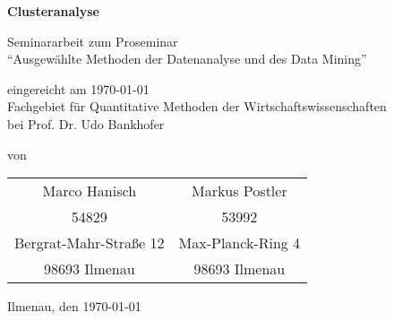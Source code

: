 \begin{titlepage}

\begin{center}
\vspace{1cm}
\large{\textbf{Clusteranalyse}}

\vspace{2cm}

\large{Seminararbeit zum Proseminar} \\ 
``Ausgewählte Methoden der Datenanalyse und des Data Mining'' \\

\vspace{4cm}

eingereicht am \today \\
Fachgebiet für Quantitative Methoden der Wirtschaftswissenschaften \\
bei Prof. Dr. Udo Bankhofer \\

\vspace{5cm}

von \\
\begin{tabular}{cc}
   Marco Hanisch & Markus Postler \\ 
   54829 & 53992 \\ 
   Bergrat-Mahr-Straße 12 & Max-Planck-Ring 4 \\ 
   98693 Ilmenau & 98693 Ilmenau \\ 
 \end{tabular}

\vspace{5cm}

Ilmenau, den \today
\end{center}

\end{titlepage}
